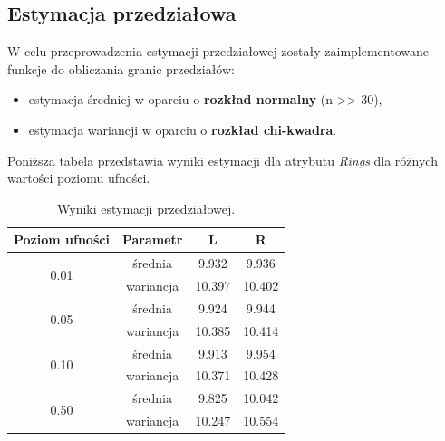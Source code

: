 \documentclass{scrartcl}
\begin{document}
\subsection{Estymacja przedziałowa}
W celu przeprowadzenia estymacji przedziałowej zostały zaimplementowane funkcje
do obliczania granic przedziałów:
\begin{itemize}
  \item{estymacja średniej w oparciu o \textbf{rozkład normalny} (n >> 30),}
  \item{estymacja wariancji w oparciu o \textbf{rozkład chi-kwadra}.}
\end{itemize}
Poniższa tabela przedstawia wyniki estymacji dla atrybutu \textit{Rings} dla różnych
wartości poziomu ufności.

\begin{table}[H]
  \center
  \begin{tabular}{c|ccc}
    \textbf{Poziom ufności} & \textbf{Parametr} & \textbf{L} & \textbf{R} \\ \hline
    \multirow{2}{*}{0.01}  & średnia            &  9.932     & 9.936 \\
                           & wariancja          &  10.397    & 10.402 \\ \hline

    \multirow{2}{*}{0.05}  & średnia            &  9.924     & 9.944 \\
                           & wariancja          &  10.385    & 10.414 \\ \hline

    \multirow{2}{*}{0.10}  & średnia            &  9.913     & 9.954 \\
                           & wariancja          &  10.371    & 10.428 \\ \hline
                           
    \multirow{2}{*}{0.50}  & średnia            &  9.825     & 10.042 \\
                           & wariancja          &  10.247    & 10.554 \\ 
                           
  \end{tabular}

  \caption{Wyniki estymacji przedziałowej.}
\end{table}
\end{document}
